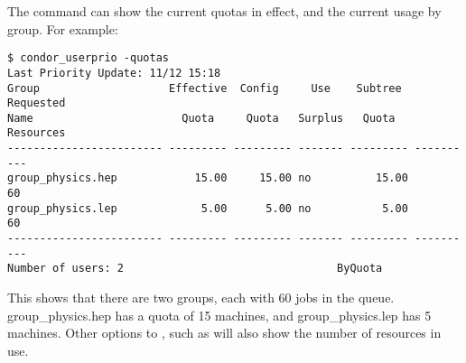 The  command can show the current quotas in effect, 
and the current usage by group.
For example:
\begin{verbatim}
$ condor_userprio -quotas
Last Priority Update: 11/12 15:18
Group                    Effective  Config     Use    Subtree  Requested 
Name                       Quota     Quota   Surplus   Quota   Resources 
------------------------ --------- --------- ------- --------- ----------
group_physics.hep            15.00     15.00 no          15.00         60
group_physics.lep             5.00      5.00 no           5.00         60
------------------------ --------- --------- ------- --------- ----------
Number of users: 2                                 ByQuota                     
\end{verbatim}

This shows that there are two groups, each with 60 jobs in the queue.  
group\_physics.hep has a quota of 15 machines, 
and group\_physics.lep has 5 machines.  
Other options to ,
such as  will also show the number of resources in use.

